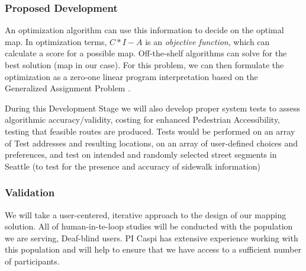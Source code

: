 

\subsubsection{Proposed Development}

An optimization algorithm can use this information to decide on the optimal map. In optimization terms, $C*I-A$ is an \textit{objective function}, which can calculate a score for a possible map. Off-the-shelf algorithms can solve for the best solution (map in our case). For this problem, we can then  formulate the optimization as a zero-one linear program interpretation based on the Generalized Assignment Problem 
\cite{kuhn1955hungarian}. 

During this Development Stage we will also develop proper system tests to assess algorithmic accuracy/validity, costing for  enhanced Pedestrian Accessibility, testing that feasible routes are produced. Tests would be performed on  an array of Test addresses and resulting locations, on an array of user-defined choices and preferences, and test on 
intended and randomly selected street segments in Seattle (to test for the presence and accuracy of sidewalk information)



\subsubsection{Validation}
We will take a user-centered, iterative approach to the design of our mapping solution. 
All of human-in-te-loop studies will be conducted with the population we are serving, Deaf-blind users. 
PI Caspi has extensive experience working with this population  and will  
help to ensure that we have access to a sufficient number of participants.  


